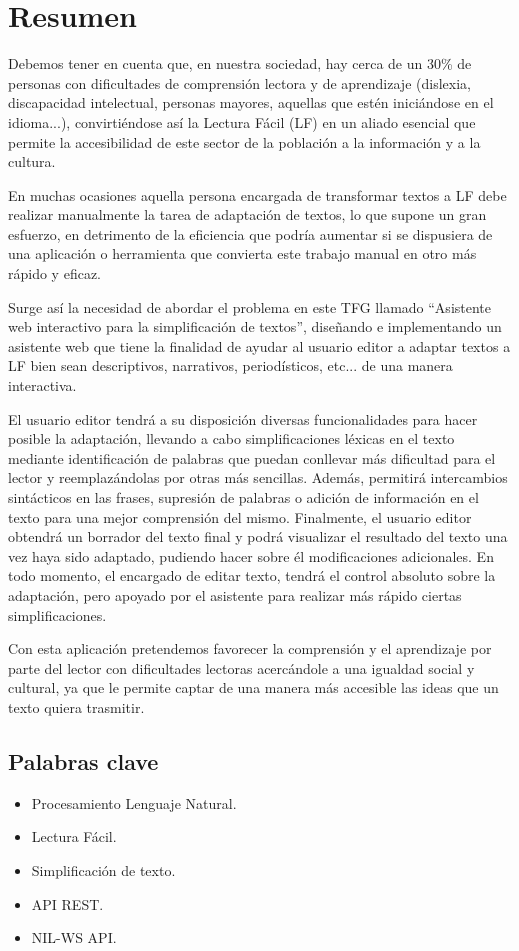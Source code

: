 \chapter*{Resumen}

Debemos tener en cuenta que, en nuestra sociedad, hay cerca de un 30\% de personas con dificultades de comprensión lectora y de aprendizaje (dislexia, discapacidad intelectual, personas mayores, aquellas que estén iniciándose en el idioma...), convirtiéndose así la Lectura Fácil (LF) en un aliado esencial que permite la accesibilidad de este sector de la población a la información y a la cultura. 

 \setlength{\parskip}{10pt}

En muchas ocasiones aquella persona encargada de transformar textos a LF debe realizar manualmente la tarea de adaptación de textos, lo que supone un gran esfuerzo, en detrimento de la eficiencia que podría aumentar si se dispusiera de una aplicación o herramienta que convierta este trabajo manual en otro más rápido y eficaz.

 \setlength{\parskip}{10pt}

Surge así la necesidad de abordar el problema en este TFG llamado ``Asistente web interactivo para la simplificación de textos'', diseñando e implementando un asistente web que tiene la finalidad de ayudar al usuario editor a adaptar textos a LF bien sean descriptivos, narrativos, periodísticos, etc... de una manera interactiva. 

 \setlength{\parskip}{10pt}

El usuario editor tendrá a su disposición diversas funcionalidades para hacer posible la adaptación, llevando a cabo simplificaciones léxicas en el texto mediante identificación de palabras que puedan conllevar más dificultad para el lector y reemplazándolas por otras más sencillas. Además, permitirá intercambios sintácticos en las frases, supresión de palabras o adición de información en el texto para una mejor comprensión del mismo. Finalmente, el usuario editor obtendrá un borrador del texto final y podrá visualizar el resultado del texto una vez haya sido adaptado, pudiendo hacer sobre él modificaciones adicionales. En todo momento, el encargado de editar texto, tendrá el control absoluto sobre la adaptación, pero apoyado por el asistente para realizar más rápido ciertas simplificaciones.

 \setlength{\parskip}{10pt}

Con esta aplicación pretendemos favorecer la comprensión y el aprendizaje por parte del lector con dificultades lectoras acercándole a una igualdad social y cultural, ya que le permite captar de una manera más accesible las ideas que un texto quiera trasmitir.



\section*{Palabras clave}
   
\begin{itemize}
   	\item Procesamiento Lenguaje Natural.
   	\item Lectura Fácil.
   	\item Simplificación de texto.
   	\item API REST.
   	\item NIL-WS API.
\end{itemize}
   



